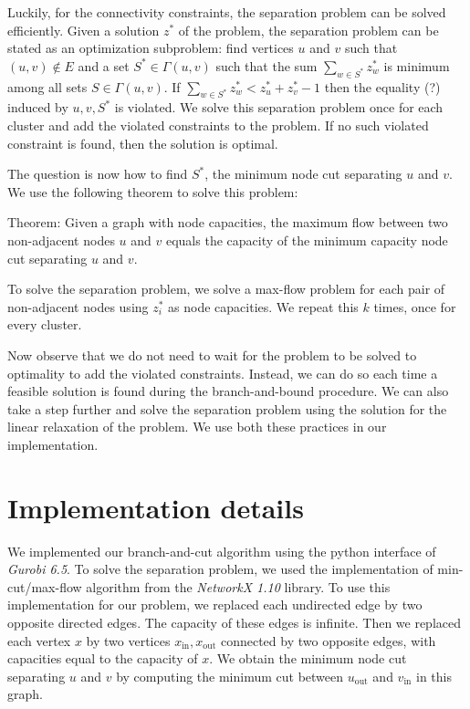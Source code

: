 \documentclass[]{article}
\begin{document}
Luckily, for the connectivity constraints, the separation problem can be
solved efficiently. Given a solution $z^*$ of the problem, the
separation problem can be stated as an optimization subproblem: find
vertices $u$ and $v$ such that $(u, v) \notin E$ and a set
$S^* \in \Gamma(u, v)$ such that the sum $\sum_{w \in S^*} z_w^*$ is
minimum among all sets $S \in \Gamma(u, v)$. If
$\sum_{w \in S^*} z_w^* < z^*_u + z^*_v - 1$ then the equality (?)
induced by $u, v, S^*$ is violated. We solve this separation problem
once for each cluster and add the violated constraints to the problem.
If no such violated constraint is found, then the solution is optimal.

The question is now how to find $S^*$, the minimum node cut separating
$u$ and $v$. We use the following theorem to solve this problem:

Theorem: Given a graph with node capacities, the maximum flow between
two non-adjacent nodes $u$ and $v$ equals the capacity of the minimum
capacity node cut separating $u$ and $v$.

To solve the separation problem, we solve a max-flow problem for each
pair of non-adjacent nodes using $z^*_i$ as node capacities. We repeat
this $k$ times, once for every cluster.

Now observe that we do not need to wait for the problem to be solved to
optimality to add the violated constraints. Instead, we can do so each
time a feasible solution is found during the branch-and-bound procedure.
We can also take a step further and solve the separation problem using
the solution for the linear relaxation of the problem. We use both these
practices in our implementation.

\section{Implementation details}
\label{sec:implementation}

We implemented our branch-and-cut algorithm using the python interface
of \emph{Gurobi 6.5}. To solve the separation problem, we used the
implementation of min-cut/max-flow algorithm from the \emph{NetworkX
1.10} library. To use this implementation for our problem, we replaced
each undirected edge by two opposite directed edges. The capacity of
these edges is infinite. Then we replaced each vertex $x$ by two
vertices $x_{\text{in}}, x_{\text{out}}$ connected by two opposite
edges, with capacities equal to the capacity of $x$. We obtain the
minimum node cut separating $u$ and $v$ by computing the minimum cut
between $u_{\text{out}}$ and $v_{\text{in}}$ in this graph.
\end{document}
